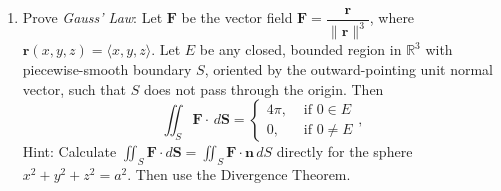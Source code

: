 \documentclass[12pt]{article}
\newcommand{\points}[1]{\marginpar{\hspace{24pt}[#1]}}
\newcommand{\R}{\mathbb{R}}
\renewcommand{\S}{\mathbf{S}}
\renewcommand{\r}{\mathbf{r}}
\newcommand{\dotp}{\,\boldsymbol{\cdot}\,}
\newcommand{\F}{\mathbf{F}}
\begin{document}
\begin{enumerate}
\newpage

\item  Prove {\em Gauss' Law}: Let $\F$ be the vector field $\F = \dfrac{\r}{\lVert\r\rVert^3}$, where $\r(x,y,z) = \langle x,y,z\rangle$. Let $E$ be any closed, bounded region in $\R^3$ with piecewise-smooth boundary $S$, oriented by the outward-pointing unit normal vector, such that $S$ does not pass through the origin. Then\points{10}
\[
\iint_S \F\dotp \,d\S = \begin{cases} 4\pi, & \text{ if } 0\in E\\ 0, & \text{ if } 0\neq E\end{cases},
\]
Hint: Calculate $\iint_S \F\dotp d\S=\iint_S \F\dotp \mathbf{n}\,dS$ directly for the sphere $x^2+y^2+z^2=a^2$. Then use the Divergence Theorem.
\end{enumerate}
\end{document}
